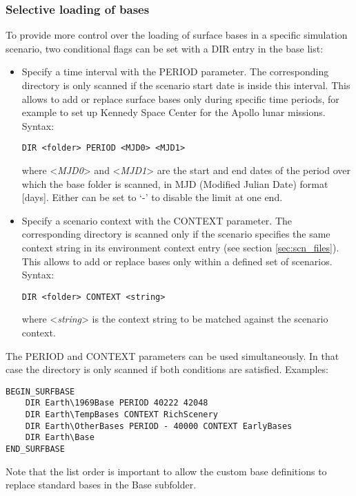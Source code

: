 \documentclass[Orbiter Developer Manual.tex]{subfiles}
\begin{document}
\subsubsection*{Selective loading of bases}
To provide more control over the loading of surface bases in a specific simulation scenario, two conditional flags can be set with a DIR entry in the base list:

\begin{itemize}
\item Specify a time interval with the PERIOD parameter. The corresponding directory is only scanned if the scenario start date is inside this interval. This allows to add or replace surface bases only during specific time periods, for example to set up Kennedy Space Center for the Apollo lunar missions. Syntax:

\begin{lstlisting}[language=OSFS]
DIR <folder> PERIOD <MJD0> <MJD1>
\end{lstlisting}

\noindent
where <\textit{MJD0}> and <\textit{MJD1}> are the start and end dates of the period over which the base folder is scanned, in MJD (Modified Julian Date) format [days]. Either can be set to ‘-’ to disable the limit at one end.
\item Specify a scenario context with the CONTEXT parameter. The corresponding directory is scanned only if the scenario specifies the same context string in its environment context entry (see section \ref{sec:scn_files}). This allows to add or replace bases only within a defined set of scenarios. Syntax:

\begin{lstlisting}[language=OSFS]
DIR <folder> CONTEXT <string>
\end{lstlisting}

\noindent
where <\textit{string}> is the context string to be matched against the scenario context.
\end{itemize}

\noindent
The PERIOD and CONTEXT parameters can be used simultaneously. In that case the directory is only scanned if both conditions are satisfied. Examples:
\begin{lstlisting}[language=OSFS]
BEGIN_SURFBASE
	DIR Earth\1969Base PERIOD 40222 42048
	DIR Earth\TempBases CONTEXT RichScenery
	DIR Earth\OtherBases PERIOD - 40000 CONTEXT EarlyBases
	DIR Earth\Base
END_SURFBASE
\end{lstlisting}

\noindent
Note that the list order is important to allow the custom base definitions to replace standard bases in the Base subfolder.
\end{document}
